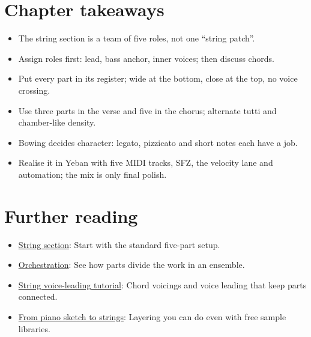 \section{Chapter takeaways}
\label{sec:string-takeaways}

\begin{itemize}
\item The string section is a team of five roles, not one ``string patch''.
\item Assign roles first: lead, bass anchor, inner voices; then discuss chords.
\item Put every part in its register; wide at the bottom, close at the top, no voice crossing.
\item Use three parts in the verse and five in the chorus; alternate tutti and chamber-like density.
\item Bowing decides character: legato, pizzicato and short notes each have a job.
\item Realise it in Yeban with five MIDI tracks, SFZ, the velocity lane and automation; the mix is only final polish.
\end{itemize}

\section{Further reading}
\label{sec:06-strings-further-reading}
\begin{itemize}
  \item \href{https://en.wikipedia.org/wiki/String_section}{String section}: Start with the standard five-part setup.
  \item \href{https://en.wikipedia.org/wiki/Orchestration}{Orchestration}: See how parts divide the work in an ensemble.
  \item \href{https://www.youtube.com/watch?v=UlJ3a7xvCYI}{String voice-leading tutorial}: Chord voicings and voice leading that keep parts connected.
  \item \href{https://www.youtube.com/watch?v=CSq3tsfYcUU}{From piano sketch to strings}: Layering you can do even with free sample libraries.
\end{itemize}

